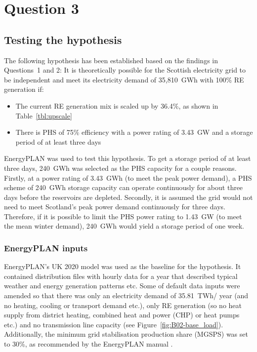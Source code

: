 \section{Question 3}



\subsection{Testing the hypothesis}

The following hypothesis has been established based on the findings in Questions~1 and 2:
It is theoretically possible for the Scottish electricity grid to be independent and meet its electricity demand of 35,810~GWh with 100\% RE generation if:
\begin{itemize}
	\item The current RE generation mix is scaled up by 36.4\%, as shown in Table~\ref{tbl:upscale}
	\item There is PHS of 75\% efficiency with a power rating of 3.43~GW and a storage period of at least three days
\end{itemize}

EnergyPLAN was used to test this hypothesis.
To get a storage period of at least three days, 240~GWh was selected as the PHS capacity for a couple reasons.
Firstly, at a power rating of 3.43~GWh (to meet the peak power demand), a PHS scheme of 240~GWh storage capacity can operate continuously for about three days before the reservoirs are depleted.
Secondly, it is assumed the grid would not need to meet Scotland's peak power demand continuously for three days.
Therefore, if it is possible to limit the PHS power rating to 1.43~GW (to meet the mean winter demand), 240~GWh would yield a storage period of one week.



\subsubsection{EnergyPLAN inputs}

EnergyPLAN's UK 2020 model \citep{EnergyPLAN_UK2020} was used as the baseline for the hypothesis.
It contained distribution files with hourly data for a year that described typical weather and energy generation patterns etc.
Some of default data inputs were amended so that there was only an electricity demand of 35.81~TWh/ year (and no heating, cooling or transport demand etc.), only RE generation (so no heat supply from district heating, combined heat and power (CHP) or heat pumps etc.) and no transmission line capacity (see Figure~\ref{fig:B02-base_load}).
Additionally, the minimum grid stabilisation production share (MGSPS) was set to 30\%, as recommended by the EnergyPLAN manual \citep{Lund2017}.

